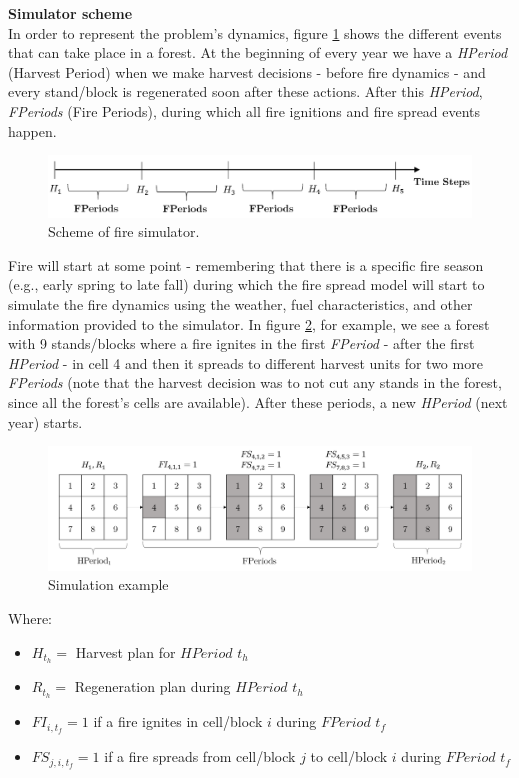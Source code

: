 \documentclass[11pt]{article}
\begin{document}
\textbf{Simulator scheme}\\

In order to represent the problem's dynamics, figure \ref{tline} shows
the different events that can take place in a forest. At the beginning of every year we
have a \textit{HPeriod }(Harvest Period) when we make harvest
decisions - before fire dynamics - and every stand/block is regenerated
soon after these actions. After this \textit{HPeriod},
\textit{FPeriods }(Fire Periods), during which all fire ignitions and
fire spread events happen. 

\begin{figure}[h!]
\centering
\includegraphics[scale=0.9]{TimeLine.png}
\caption{\label{tline} Scheme of fire simulator.}	 
\end{figure}

Fire will start at some point - remembering that there is a specific
fire season (e.g., early spring to late fall) during which the fire spread model will start
to simulate the fire dynamics using the weather, fuel characteristics, and other information
provided to the simulator. In
figure \ref{Periods}, for example, we see a forest with 9
stands/blocks where a fire ignites in the first \textit{FPeriod }-
after the first \textit{HPeriod }- in cell 4 and then it spreads to
different harvest units for two more \textit{FPeriods }(note that the
harvest decision was to not cut any stands in the forest, since all the forest's
cells are available). After these periods, a new \textit{HPeriod} (next year) starts.

\begin{figure}[h!]
	\centering
	\includegraphics[scale=0.8]{Periods.png}
	\caption{\label{Periods} Simulation example}
\end{figure}
Where:
\begin{itemize}
	\item $H_{t_{h}} = $ Harvest plan for $HPeriod$ $t_{h}$
	\item $R_{t_{h}} = $ Regeneration plan during $HPeriod $ $t_{h}$
	\item $FI_{i,t_{f}} = 1 $ if a fire ignites in cell/block $i$ during $ FPeriod $ $t_{f}$
	\item $FS_{j,i,t_{f}} = 1 $ if a fire spreads from cell/block $j$ to cell/block $i$ during $ FPeriod $ $t_{f}$
\end{itemize}
\end{document}
